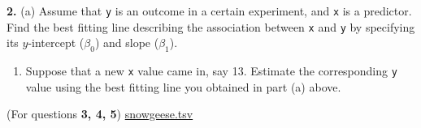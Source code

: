\documentclass[]{article}
\providecommand{\tightlist}{%
  \setlength{\itemsep}{0pt}\setlength{\parskip}{0pt}}
\begin{document}
\bigskip

\textbf{2.} (a) Assume that \texttt{y} is an outcome in a certain
experiment, and \texttt{x} is a predictor. Find the best fitting line
describing the association between \texttt{x} and \texttt{y} by
specifying its \(y\)-intercept (\(\beta_0\)) and slope (\(\beta_1\)).

\begin{enumerate}
\def\labelenumi{(\alph{enumi})}
\setcounter{enumi}{1}
\tightlist
\item
  Suppose that a new \texttt{x} value came in, say 13. Estimate the
  corresponding \texttt{y} value using the best fitting line you
  obtained in part (a) above.
\end{enumerate}

(For questions \textbf{3, 4, 5})
\href{https://junglee0713.netlify.com/Drexel_lectures/snowgeese.tsv}{snowgeese.tsv}
\end{document}
